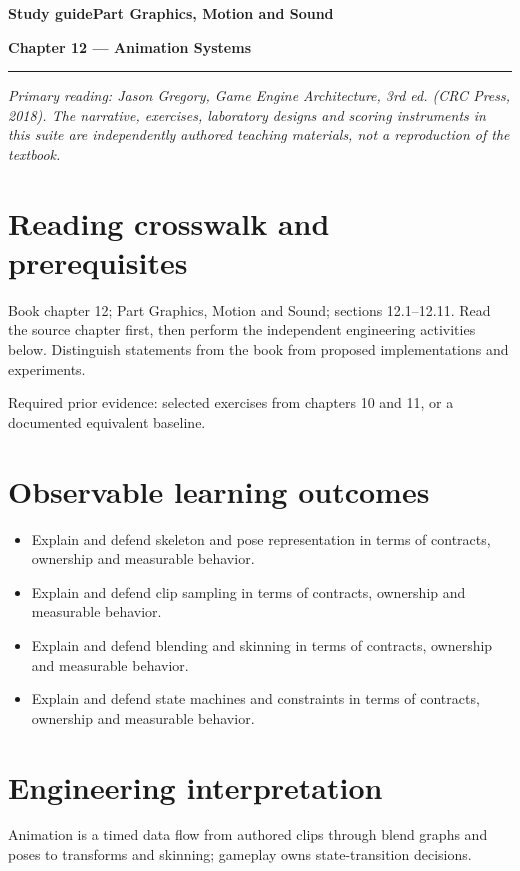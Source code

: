 \documentclass[11pt,letterpaper]{article}
\newcommand{\DocType}{Reference}
\newcommand{\SuiteHeading}[3]{%
\renewcommand{\DocType}{#2}%
{\small\bfseries\sffamily\color{EngineTeal}#2\hfill #3}\par\vspace{6pt}
{\LARGE\bfseries\color{EngineBlue}#1}\par\vspace{4pt}
{\color{EngineTeal}\rule{\linewidth}{1pt}}\par\vspace{7pt}}
\newcommand{\SourceNote}{\footnotesize\textit{Primary reading: Jason Gregory, \emph{Game Engine Architecture}, 3rd ed. (CRC Press, 2018). The narrative, exercises, laboratory designs and scoring instruments in this suite are independently authored teaching materials, not a reproduction of the textbook.}\normalsize\par}
\begin{document}
\SuiteHeading{Chapter 12 — Animation Systems}{Study guide}{Part Graphics, Motion and Sound}
\SourceNote
\section{Reading crosswalk and prerequisites}
Book chapter 12; Part Graphics, Motion and Sound; sections 12.1--12.11. Read the source chapter first, then perform the independent engineering activities below. Distinguish statements from the book from proposed implementations and experiments.

Required prior evidence: selected exercises from chapters 10 and 11, or a documented equivalent baseline.

\section{Observable learning outcomes}
\begin{itemize}
\item Explain and defend skeleton and pose representation in terms of contracts, ownership and measurable behavior.
\item Explain and defend clip sampling in terms of contracts, ownership and measurable behavior.
\item Explain and defend blending and skinning in terms of contracts, ownership and measurable behavior.
\item Explain and defend state machines and constraints in terms of contracts, ownership and measurable behavior.
\end{itemize}
\section{Engineering interpretation}
Animation is a timed data flow from authored clips through blend graphs and poses to transforms and skinning; gameplay owns state-transition decisions.
\end{document}
